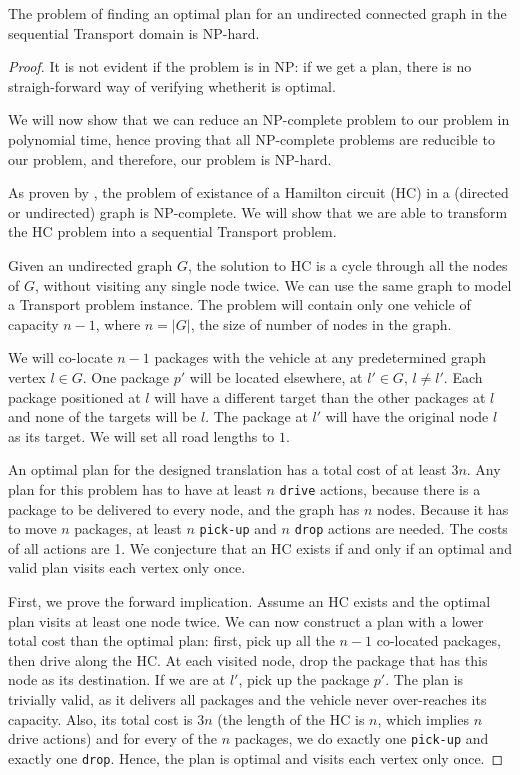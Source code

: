 \begin{thm}
The problem of finding an optimal plan for an undirected connected graph in the sequential
Transport domain is NP-hard. 
\end{thm}
\begin{proof}
It is not evident if the problem is in NP: if we get a plan, there is no straigh-forward
way of verifying whetherit is optimal.

We will now show that we can reduce an NP-complete problem to our problem in polynomial time,
hence proving that all NP-complete problems are reducible to our problem,
and therefore, our problem is NP-hard.

As proven by \citet{Karp1972}, the problem of existance of a Hamilton circuit (HC) in a (directed or undirected) graph is NP-complete. We will show that we are able to transform the HC problem into a sequential Transport problem.

Given an undirected graph $G$, the solution to HC is a cycle through all the nodes of $G$,
without visiting any single node twice.
We can use the same graph to model a Transport problem instance.
The problem will contain only one vehicle of capacity $n-1$,
where $n = |G|$, the size of number of nodes in the graph.

We will co-locate $n-1$ packages with the vehicle at any predetermined graph vertex $l \in G$.
One package $p'$ will be located elsewhere, at $l' \in G,\, l \neq l'$.
Each package positioned at $l$ will have a different target than the other packages at $l$
and none of the targets will be $l$. The package at $l'$ will have the original node $l$
as its target. We will set all road lengths to $1$. 

An optimal plan for the designed translation has a total cost of at least $3n$.
Any plan for this problem has to have at least $n$ \verb+drive+ actions, because
there is a package to be delivered to every node, and the graph has $n$ nodes.
Because it has to move $n$ packages, at least $n$ \verb+pick-up+ and $n$ \verb+drop+
actions are needed. The costs of all actions are 1.
We conjecture that an HC exists if and only if an optimal and valid plan visits each vertex only once.

First, we prove the forward implication. Assume an HC exists and the optimal plan visits at least one node twice. We can now construct a plan with a lower total cost than the optimal plan: first, pick up all the $n-1$ co-located packages, then drive along the HC. At each
visited node, drop the package that has this node as its destination. If we are at $l'$,
pick up the package $p'$. The plan is trivially valid, as it delivers all packages
and the vehicle never over-reaches its capacity. Also, its total cost is $3n$
(the length of the HC is $n$, which implies $n$ drive actions) and for every of the $n$ packages, we do exactly one \verb+pick-up+ and exactly one \verb+drop+. Hence, the plan
is optimal and visits each vertex only once.


\end{proof}
